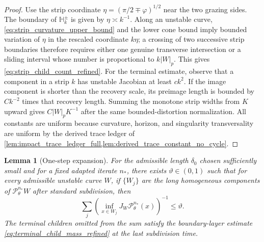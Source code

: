 \documentclass[12pt, letterpaper]{amsart}
\newcommand{\Pcal}{\mathcal{P}}
\theoremstyle{plain}
\newtheorem{lemma}[theorem]{Lemma}
\theoremstyle{definition}
\theoremstyle{remark}
\begin{document}
\begin{proof}
Use the strip coordinate
$\eta=(\pi/2\mp\varphi)^{1/2}$ near the two grazing sides.  The boundary of
$\mathbb H_k^\pm$ is given by $\eta\asymp k^{-1}$.  Along an unstable curve,
\eqref{eq:strip_curvature_upper_bound} and the lower cone bound imply bounded
variation of $\eta$ in the rescaled coordinate $k\eta$; a crossing of two
successive strip boundaries therefore requires either one genuine transverse
intersection or a sliding interval whose number is proportional to $k|W|_p$.
This gives \eqref{eq:strip_child_count_refined}.  For the terminal estimate,
observe that a component in a strip $k$ has unstable Jacobian at least $ck^2$.
If the image component is shorter than the recovery scale, its preimage length
is bounded by $Ck^{-2}$ times that recovery length.  Summing the monotone strip
widths from $K$ upward gives $C|W|_pK^{-1}$ after the same bounded-distortion
normalization.  All constants are uniform because curvature, horizon, and
singularity transversality are uniform by the derived trace ledger of \cref{lem:impact_trace_ledger_full,lem:derived_trace_constant_no_cycle}.
\end{proof}

\begin{lemma}[One-step expansion]
\label{lem:one_step_expansion}
For the admissible length $\delta_0$ chosen sufficiently small and for a fixed
adapted iterate $n_*$, there exists $\vartheta\in(0,1)$ such that for every
admissible unstable curve $W$, if $\{W_j\}$ are the long homogeneous components
of $\Pcal_\theta^{n_*}W$ after standard subdivision, then
\begin{equation}
\label{eq:one_step_expansion_refined}
    \sum_j \left(\inf_{x\in W_j} J_W\Pcal_\theta^{n_*}(x)\right)^{-1}
    \le \vartheta .
\end{equation}
The terminal children omitted from the sum satisfy the boundary-layer estimate
\eqref{eq:terminal_child_mass_refined} at the last subdivision time.
\end{lemma}
\end{document}
